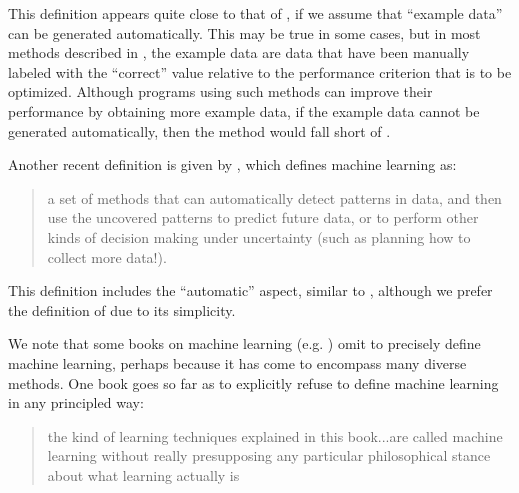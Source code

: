 This definition appears quite close to that of \cite{Mitchell1990}, if we assume that ``example data'' can be generated automatically. This may be true in some cases, but in most methods described in \cite{alpaydin2014introduction}, the example data are data that have been manually labeled with the ``correct'' value relative to the performance criterion that is to be optimized. Although programs using such methods can improve their performance by obtaining more example data, if the example data cannot be generated automatically, then the method would fall short of \cite{Mitchell1990}.

Another recent definition is given by \cite{Murphy2012}, which defines machine learning as:
%
\begin{quote}
a set of methods that can automatically detect patterns in data, and then use the uncovered patterns to predict future data, or to perform other kinds of decision making under uncertainty (such as planning how to collect more data!).
\end{quote}
%
This definition includes the ``automatic'' aspect, similar to \cite{Mitchell1990}, although we prefer the definition of \cite{Mitchell1990} due to its simplicity.

We note that some books on machine learning (e.g. \cite{bishop2006pattern}) omit to precisely define machine learning, perhaps because it has come to encompass many diverse methods. One book goes so far as to explicitly refuse to define machine learning in any principled way:
%
\begin{quote}
the kind of learning techniques explained in this book...are called machine learning without really presupposing any particular philosophical stance about what learning actually is \cite{witten2005data}
\end{quote}
%



